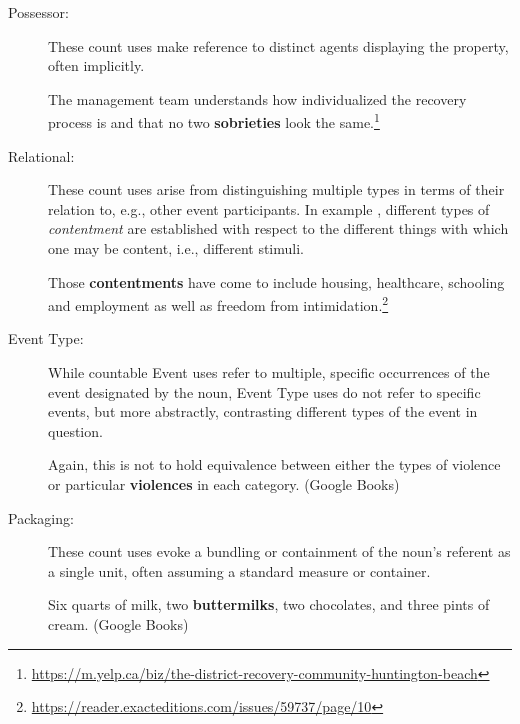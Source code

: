 \documentclass[output=paper]{langscibook}
\begin{document}
\begin{description}
\item[Possessor:] These count uses make reference to distinct agents displaying the property, often implicitly.

\eanoraggedright \label{gri-ric:ex:sobrieties} The management team understands how individualized the recovery process is and that no two \textbf{sobrieties} look the same.\footnote{\url{https://m.yelp.ca/biz/the-district-recovery-community-huntington-beach}} \z


\item[Relational:] These count uses  arise from distinguishing multiple types in terms of their relation to, e.g., other event participants.  In example , different types of \textit{contentment} are established with respect to the different things with which one may be content, i.e., different stimuli.


\eanoraggedright \label{gri-ric:ex:contentments} Those \textbf{contentments} have come to include housing, healthcare, schooling and employment as well as freedom from intimidation.\footnote{\url{https://reader.exacteditions.com/issues/59737/page/10}} \z

\item[Event Type:] While countable Event uses refer to multiple, specific occurrences of the event designated by the noun, Event Type uses do not refer to specific events, but more abstractly, contrasting different types of the event in question.


\eanoraggedright \label{gri-ric:ex:violences} Again, this is not to hold equivalence between either the types of violence or particular \textbf{violences} in each category. \hfill (Google Books)\z



\item[Packaging:]  These count uses  evoke a bundling or containment of the noun's referent as a single unit, often assuming a standard measure or container. %

\eanoraggedright \label{gri-ric:ex:buttermilks}
Six quarts of milk, two \textbf{buttermilks}, two chocolates, and three pints of cream. \hfill (Google Books)
\z



\end{description}
\end{document}
